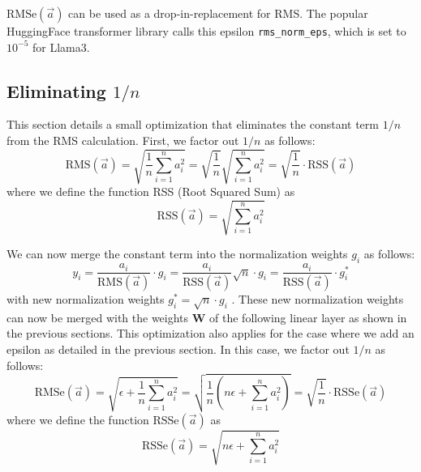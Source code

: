 \documentclass{article}
\numberwithin{equation}{section} %
\newcommand{\mat}[1]{\mathbf{#1}}     %
\def\rms{\text{RMS}(\vec{a})}         %
\def\f1n{\frac{1}{n}}                 %
\def\sas{\sum_{i=1}^n a_i^2}          %
\def\a{\vec{a}}                       %
\begin{document}
$\text{RMSe}(\a)$ can be used as a drop-in-replacement for RMS. The popular HuggingFace transformer library calls this epsilon \verb+rms_norm_eps+, which is set to $10^{-5}$ for Llama3.

\subsection*{Eliminating $1/n$}
This section details a small optimization that eliminates the constant term $1/n$ from the RMS calculation. First, we factor out $1/n$ as follows:
\begin{equation*}
  \rms = \sqrt{\f1n \sas} = \sqrt{\f1n} \sqrt{\sas} = \sqrt{\f1n} \cdot \text{RSS}(\a)
\end{equation*}
where we define the function RSS (Root Squared Sum) as
\begin{equation*}
  \text{RSS}(\a) = \sqrt{\sas}
\end{equation*}

We can now merge the constant term into the normalization weights $g_i$ as follows:
\begin{equation*}
  y_i = \frac{a_i}{\rms} \cdot g_i =
  \frac{a_i}{\text{RSS}(\a)} \sqrt{n} \cdot g_i =
  \frac{a_i}{\text{RSS}(\a)}          \cdot g_i^\ast
\end{equation*}
with new normalization weights $g_i^\ast = \sqrt{n} \cdot g_i$ . These new normalization weights can now be merged with the weights $\mat{W}$ of the following linear layer as shown in the previous sections. This optimization also applies for the case where we add an epsilon as detailed in the previous section. In this case, we factor out $1/n$ as follows:
\begin{equation*}
  \text{RMSe}(\a) = \sqrt{\epsilon + \f1n \sas}
  = \sqrt{\f1n \left( n \epsilon + \sas \right)}
  = \sqrt{\f1n} \cdot \text{RSSe}(\a)
\end{equation*}
where we define the function $\text{RSSe}(\a)$ as
\begin{equation*}
  \text{RSSe}(\a) = \sqrt{n \epsilon + \sas}
\end{equation*}
\end{document}
